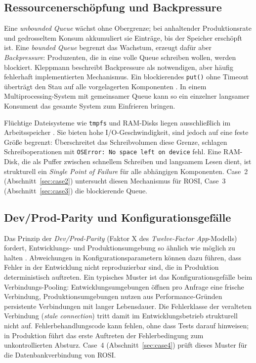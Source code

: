 \subsection{Ressourcenerschöpfung und Backpressure}
\label{sec:grundlagen-ressourcen}

Eine \textit{unbounded Queue} wächst ohne Obergrenze; bei anhaltender Produktionsrate und
gedrosseltem Konsum akkumuliert sie Einträge, bis der Speicher erschöpft ist. Eine
\textit{bounded Queue} begrenzt das Wachstum, erzeugt dafür aber \textit{Backpressure}:
Produzenten, die in eine volle Queue schreiben wollen, werden blockiert. Kleppmann
beschreibt Backpressure als notwendigen, aber häufig fehlerhaft implementierten
Mechanismus. Ein blockierendes \texttt{put()} ohne Timeout überträgt den Stau auf alle
vorgelagerten Komponenten \cite{kleppmann2017}. In einem Multiprocessing-System
mit gemeinsamer Queue kann so ein einzelner langsamer Konsument das gesamte System zum
Einfrieren bringen.

Flüchtige Dateisysteme wie \texttt{tmpfs} und RAM-Disks liegen ausschließlich im
Arbeitsspeicher \cite{linux_tmpfs}. Sie bieten hohe I/O-Geschwindigkeit, sind jedoch auf
eine feste Größe begrenzt: Überschreitet das Schreibvolumen diese Grenze, schlagen
Schreiboperationen mit \texttt{OSError: No space left on device} fehl. Eine RAM-Disk, die
als Puffer zwischen schnellem Schreiben und langsamem Lesen dient, ist strukturell ein
\textit{Single Point of Failure} für alle abhängigen Komponenten. Case~2
(Abschnitt~\ref{sec:case2}) untersucht diesen Mechanismus für ROSI, Case~3
(Abschnitt~\ref{sec:case3}) die blockierende Queue.

\subsection{Dev/Prod-Parity und Konfigurationsgefälle}
\label{sec:grundlagen-parity}

Das Prinzip der \textit{Dev/Prod-Parity} (Faktor X des \textit{Twelve-Factor App}-Modells)
fordert, Entwicklungs- und Produktionsumgebung so ähnlich wie möglich zu halten
\cite{wiggins2011}. Abweichungen in Konfigurationsparametern können dazu führen, dass
Fehler in der Entwicklung nicht reproduzierbar sind, die in Produktion deterministisch
auftreten. Ein typisches Muster ist das Konfigurationsgefälle beim Verbindungs-Pooling:
Entwicklungsumgebungen öffnen pro Anfrage eine frische Verbindung, Produktionsumgebungen
nutzen aus Performance-Gründen persistente Verbindungen mit langer Lebensdauer. Die
Fehlerklasse der veralteten Verbindung (\textit{stale connection}) tritt damit im
Entwicklungsbetrieb strukturell nicht auf. Fehlerbehandlungscode kann fehlen, ohne dass
Tests darauf hinweisen; in Produktion führt das erste Auftreten der Fehlerbedingung zum
unkontrollierten Absturz. Case~4 (Abschnitt~\ref{sec:case4}) prüft dieses Muster für die
Datenbankverbindung von ROSI.
